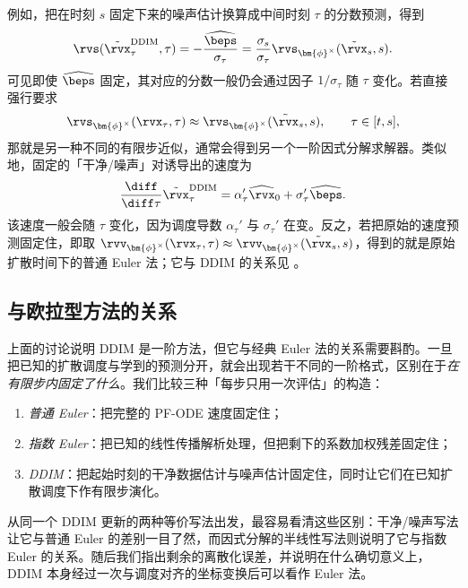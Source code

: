 例如，把在时刻 $s$ 固定下来的噪声估计换算成中间时刻 $\tau$ 的分数预测，得到
\[
\rvs(\tilde\rvx_\tau^{\mathrm{DDIM}},\tau)
=
-\frac{\widehat\beps}{\sigma_\tau}
=
\frac{\sigma_s}{\sigma_\tau}
\rvs_{\bm{\phi}^\times}(\tilde\rvx_s,s).
\]
可见即使 $\widehat\beps$ 固定，其对应的分数一般仍会通过因子 $1/\sigma_\tau$ 随 $\tau$ 变化。若直接强行要求
\[
\rvs_{\bm{\phi}^\times}(\rvx_\tau,\tau)
\approx
\rvs_{\bm{\phi}^\times}(\tilde\rvx_s,s),
\qquad
\tau\in[t,s],
\]
那就是另一种不同的有限步近似，通常会得到另一个一阶因式分解求解器。类似地，固定的「干净/噪声」对诱导出的速度为
\[
\frac{\diff}{\diff\tau}
\tilde\rvx_\tau^{\mathrm{DDIM}}
=
\alpha_\tau'\widehat\rvx_0
+
\sigma_\tau'\widehat\beps.
\]
该速度一般会随 $\tau$ 变化，因为调度导数 $\alpha_\tau'$ 与 $\sigma_\tau'$ 在变。反之，若把原始的速度预测固定住，即取 $\rvv_{\bm{\phi}^\times}(\rvx_\tau,\tau)
\approx
\rvv_{\bm{\phi}^\times}(\tilde\rvx_s,s)$，得到的就是原始扩散时间下的普通 Euler 法；它与 DDIM 的关系见 。



\subsection{与欧拉型方法的关系}
\label{subsec:ddim-classical-euler}


上面的讨论说明 DDIM 是一阶方法，但它与经典 Euler 法的关系需要斟酌。一旦把已知的扩散调度与学到的预测分开，就会出现若干不同的一阶格式，区别在于\emph{在有限步内固定了什么}。我们比较三种「每步只用一次评估」的构造：
\begin{enumerate}
    \item \emph{普通 Euler}：把完整的 PF-ODE 速度固定住；
    \item \emph{指数 Euler}：把已知的线性传播解析处理，但把剩下的系数加权残差固定住；
    \item \emph{DDIM}：把起始时刻的干净数据估计与噪声估计固定住，同时让它们在已知扩散调度下作有限步演化。
\end{enumerate}
从同一个 DDIM 更新的两种等价写法出发，最容易看清这些区别：干净/噪声写法让它与普通 Euler 的差别一目了然，而因式分解的半线性写法则说明了它与指数 Euler 的关系。随后我们指出剩余的离散化误差，并说明在什么确切意义上，DDIM 本身经过一次与调度对齐的坐标变换后可以看作 Euler 法。


